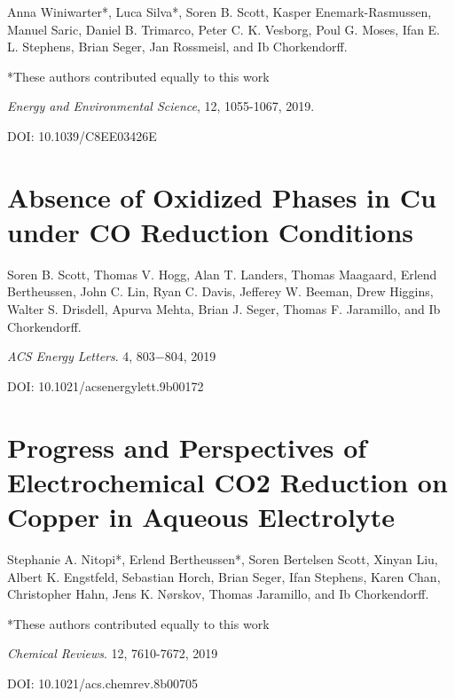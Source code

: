 		Anna Winiwarter*, Luca Silva*, Soren B. Scott, Kasper Enemark-Rasmussen, Manuel Saric, Daniel B. Trimarco, Peter C. K. Vesborg, Poul G. Moses, Ifan E. L. Stephens, Brian Seger, Jan Rossmeisl, and Ib Chorkendorff.
		
		*These authors contributed equally to this work
		
		\textit{Energy and Environmental Science}, 12, 1055-1067, 2019.
		
		DOI:  10.1039/C8EE03426E
		
		
		
		
		
		
		\clearpage
		\section{Absence of Oxidized Phases in Cu under CO Reduction Conditions}\label{Scott2019_GIXRD}
		
		Soren B. Scott, Thomas V. Hogg, Alan T. Landers, Thomas Maagaard, Erlend Bertheussen, John C. Lin, Ryan C. Davis, Jefferey W. Beeman, Drew Higgins, Walter S. Drisdell, Apurva Mehta, Brian J. Seger, Thomas F. Jaramillo, and Ib Chorkendorff.
		
		\textit{ACS Energy Letters}. 4, 803−804, 2019
		
		DOI: 10.1021/acsenergylett.9b00172 
		
		





		\clearpage
		\section{Progress and Perspectives of Electrochemical CO2 Reduction on Copper in Aqueous Electrolyte}\label{Nitopi2019}
		
		Stephanie A. Nitopi*, Erlend Bertheussen*, Soren Bertelsen Scott, Xinyan Liu, Albert K. Engstfeld, Sebastian Horch, Brian Seger, Ifan Stephens, Karen Chan, Christopher Hahn, Jens K. Nørskov, Thomas Jaramillo, and Ib Chorkendorff.
		
		*These authors contributed equally to this work
		
		\textit{Chemical Reviews}. 12, 7610-7672, 2019
		
		DOI: 10.1021/acs.chemrev.8b00705
		
		\vspace{2cm}
		
